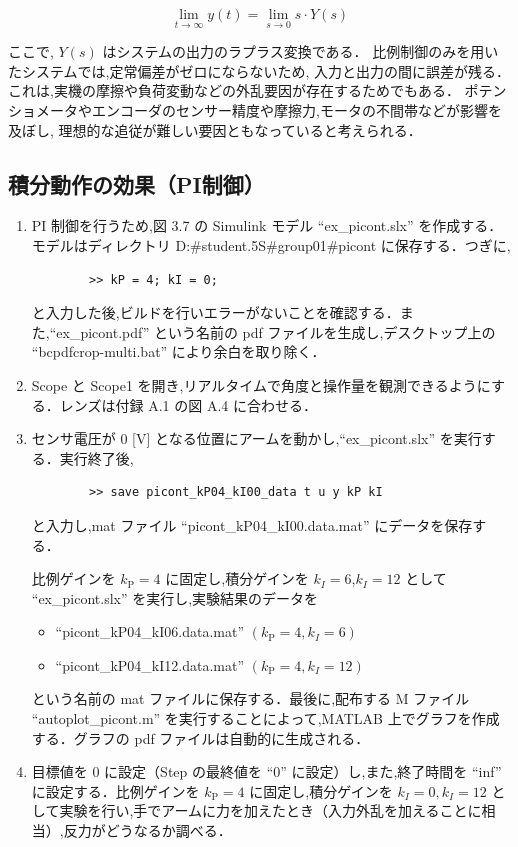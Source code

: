 \begin{equation}
  \lim_{t \to \infty} y(t) = \lim_{s \to 0} s \cdot Y(s)
\end{equation}

ここで, \( Y(s) \) はシステムの出力のラプラス変換である．
比例制御のみを用いたシステムでは,定常偏差がゼロにならないため,
入力と出力の間に誤差が残る．これは,実機の摩擦や負荷変動などの外乱要因が存在するためでもある．
ポテンショメータやエンコーダのセンサー精度や摩擦力,モータの不間帯などが影響を及ぼし,
理想的な追従が難しい要因ともなっていると考えられる．


\subsection{積分動作の効果（PI制御）}

\begin{enumerate}
  \item PI 制御を行うため,図 3.7 の Simulink モデル ``ex\_picont.slx'' を作成する．モデルはディレクトリ D:\#student.5S\#group01\#picont に保存する．つぎに,
        \begin{verbatim}
        >> kP = 4; kI = 0;
    \end{verbatim}
        と入力した後,ビルドを行いエラーがないことを確認する．また,``ex\_picont.pdf'' という名前の pdf ファイルを生成し,デスクトップ上の ``bcpdfcrop-multi.bat'' により余白を取り除く．
        
  \item Scope と Scope1 を開き,リアルタイムで角度と操作量を観測できるようにする．レンズは付録 A.1 の図 A.4 に合わせる．
        
  \item センサ電圧が 0 [V] となる位置にアームを動かし,``ex\_picont.slx'' を実行する．実行終了後,
        \begin{verbatim}
        >> save picont_kP04_kI00_data t u y kP kI
    \end{verbatim}
        と入力し,mat ファイル ``picont\_kP04\_kI00.data.mat'' にデータを保存する．
        
        比例ゲインを \( k_{\mathrm{P}} = 4 \) に固定し,積分ゲインを \( k_I = 6 \),\( k_I = 12 \) として ``ex\_picont.slx'' を実行し,実験結果のデータを
        \begin{itemize}
          \item ``picont\_kP04\_kI06.data.mat'' \((k_{\mathrm{P}} = 4, k_I = 6)\)
          \item ``picont\_kP04\_kI12.data.mat'' \((k_{\mathrm{P}} = 4, k_I = 12)\)
        \end{itemize}
        という名前の mat ファイルに保存する．最後に,配布する M ファイル ``autoplot\_picont.m'' を実行することによって,MATLAB 上でグラフを作成する．グラフの pdf ファイルは自動的に生成される．
        
  \item 目標値を 0 に設定（Step の最終値を ``0'' に設定）し,また,終了時間を ``inf'' に設定する．比例ゲインを \( k_{\mathrm{P}} = 4 \) に固定し,積分ゲインを \( k_I = 0, k_I = 12 \) として実験を行い,手でアームに力を加えたとき（入力外乱を加えることに相当）,反力がどうなるか調べる．
\end{enumerate}

